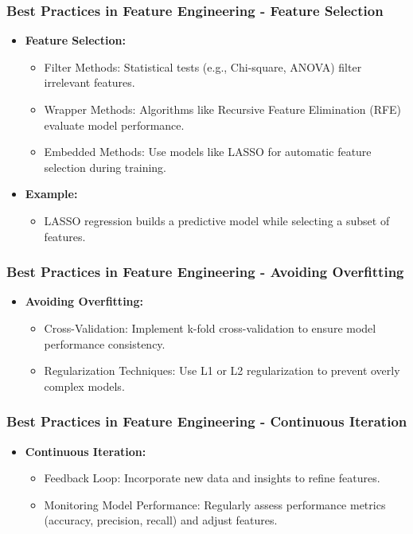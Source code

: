 \documentclass[aspectratio=169]{beamer}
\begin{document}
\begin{frame}[fragile]
    \frametitle{Best Practices in Feature Engineering - Feature Selection}
    \begin{itemize}
        \item \textbf{Feature Selection:}
        \begin{itemize}
            \item Filter Methods: Statistical tests (e.g., Chi-square, ANOVA) filter irrelevant features.
            \item Wrapper Methods: Algorithms like Recursive Feature Elimination (RFE) evaluate model performance.
            \item Embedded Methods: Use models like LASSO for automatic feature selection during training.
        \end{itemize}
        \item \textbf{Example:} 
        \begin{itemize}
            \item LASSO regression builds a predictive model while selecting a subset of features.
        \end{itemize}
    \end{itemize}
\end{frame}

\begin{frame}[fragile]
    \frametitle{Best Practices in Feature Engineering - Avoiding Overfitting}
    \begin{itemize}
        \item \textbf{Avoiding Overfitting:}
        \begin{itemize}
            \item Cross-Validation: Implement k-fold cross-validation to ensure model performance consistency.
            \item Regularization Techniques: Use L1 or L2 regularization to prevent overly complex models.
        \end{itemize}
    \end{itemize}
\end{frame}

\begin{frame}[fragile]
    \frametitle{Best Practices in Feature Engineering - Continuous Iteration}
    \begin{itemize}
        \item \textbf{Continuous Iteration:}
        \begin{itemize}
            \item Feedback Loop: Incorporate new data and insights to refine features.
            \item Monitoring Model Performance: Regularly assess performance metrics (accuracy, precision, recall) and adjust features.
        \end{itemize}
    \end{itemize}
\end{frame}
\end{document}
